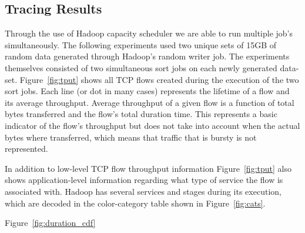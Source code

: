\subsection{Tracing Results}
\label{ssec:results}
Through the use of Hadoop capacity scheduler we are able to run multiple job's 
simultaneously. The following experiments used two unique sets of 15GB of 
random data generated through Hadoop's random writer job. The experiments themselves
consisted of two simultaneous sort jobs on each newly generated data-set. Figure~\ref{fig:tput} 
shows all TCP flows created during the execution of the two sort jobs. Each line (or dot in 
many cases) represents the lifetime of a flow and its average throughput. Average throughput 
of a given flow is a function of total bytes transferred and the flow's total duration time.
This represents a basic indicator of the flow's throughput but does not take into account 
when the actual bytes where transferred, which means that traffic that is bursty is not
represented.

In addition to low-level TCP flow throughput information Figure~\ref{fig:tput} also shows 
application-level information regarding what type of service the flow is associated with. 
Hadoop has several services and stages during its execution, which are decoded in the 
color-category table shown in Figure~\ref{fig:cats}. 

Figure~\ref{fig:duration_cdf}

